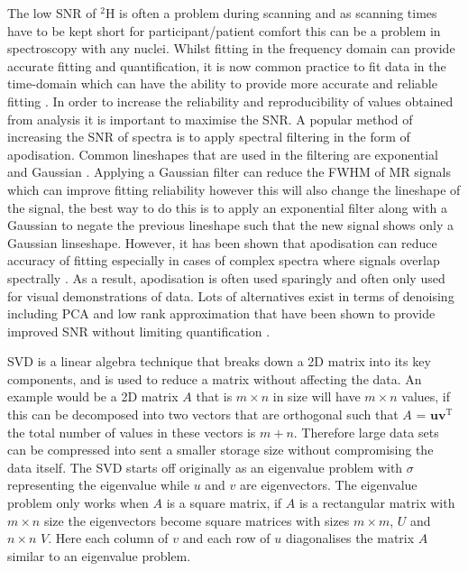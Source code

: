 The low \ac{SNR} of $^2$H is often a problem during scanning and as scanning times have to be kept short for participant/patient comfort this can be a problem in spectroscopy with any nuclei. Whilst fitting in the frequency domain can provide accurate fitting and quantification, it is now common practice to fit data in the time-domain which can have the ability to provide more accurate and reliable fitting \cite{Joliot1991InMethods}. In order to increase the reliability and reproducibility of values obtained from analysis it is important to maximise the \ac{SNR}. A popular method of increasing the \ac{SNR} of spectra is to apply spectral filtering in the form of apodisation. Common lineshapes that are used in the filtering are exponential and Gaussian \cite{Goryawala2020EffectsFitting}. Applying a Gaussian filter can reduce the \ac{FWHM} of MR signals which can improve fitting reliability however this will also change the lineshape of the signal, the best way to do this is to apply an exponential filter along with a Gaussian to negate the previous lineshape such that the new signal shows only a Gaussian linseshape. However, it has been shown that apodisation can reduce accuracy of fitting especially in cases of complex spectra where signals overlap spectrally \cite{Bartha1999FactorsFiltering}. As a result, apodisation is often used sparingly and often only used for visual demonstrations of data. Lots of alternatives exist in terms of denoising including \ac{PCA} \cite{Abdoli2016DenoisingComponents} and low rank approximation \cite{Nguyen2013DenoisingApproximations} that have been shown to provide improved \ac{SNR} without limiting quantification \cite{Clarke2022UncertaintyMethods}. 

\ac{SVD} is a linear algebra technique that breaks down a 2D matrix into its key components, and is used to reduce a matrix without affecting the data. An example would be a 2D matrix $A$ that is $m \times n$ in size will have $m \times n$ values, if this can be decomposed into two vectors that are orthogonal such that $A$ = $\mathbf{uv}^\textrm{T}$ the total number of values in these vectors is $m+n$. Therefore large data sets can be compressed into sent a smaller storage size without compromising the data itself. The \ac{SVD} starts off originally as an eigenvalue  problem with $\sigma$ representing the eigenvalue while $u$ and $v$ are eigenvectors. The eigenvalue problem only works when $A$ is a square matrix, if $A$ is a rectangular matrix with $m \times n$ size the eigenvectors become square matrices with sizes $m \times m$, $U$ and $n \times n$ $V$. Here each column of $v$ and each row of $u$ diagonalises the matrix $A$ similar to an eigenvalue problem.

